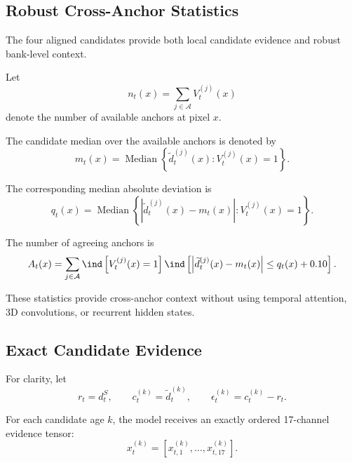\documentclass[11pt,a4paper]{article}
\begin{document}
\subsection{Robust Cross-Anchor Statistics}
\label{sec:cross_anchor_statistics}

The four aligned candidates provide both local candidate evidence and
robust bank-level context.

Let
%
\begin{equation}
n_t(x)
=
\sum_{j\in\mathcal{A}}
V_t^{(j)}(x)
\end{equation}
%
denote the number of available anchors at pixel \(x\).

The candidate median over the available anchors is denoted by
%
\begin{equation}
m_t(x)
=
\operatorname{Median}
\left\{
\widetilde d_t^{(j)}(x):
V_t^{(j)}(x)=1
\right\}.
\label{eq:candidate_median}
\end{equation}

The corresponding median absolute deviation is
%
\begin{equation}
q_t(x)
=
\operatorname{Median}
\left\{
\left|
\widetilde d_t^{(j)}(x)-m_t(x)
\right|:
V_t^{(j)}(x)=1
\right\}.
\label{eq:candidate_mad}
\end{equation}

The number of agreeing anchors is
%
\begin{equation}
A_t(x)
=
\sum_{j\in\mathcal{A}}
\ind
\left[
V_t^{(j)}(x)=1
\right]
\ind
\left[
\left|
\widetilde d_t^{(j)}(x)-m_t(x)
\right|
\leq q_t(x)+0.10
\right].
\label{eq:agreement_count}
\end{equation}

These statistics provide cross-anchor context without using temporal
attention, 3D convolutions, or recurrent hidden states.

\subsection{Exact Candidate Evidence}
\label{sec:candidate_evidence}

For clarity, let
%
\begin{equation}
r_t=d_t^S,
\qquad
c_t^{(k)}=\widetilde d_t^{(k)},
\qquad
\epsilon_t^{(k)}=c_t^{(k)}-r_t.
\end{equation}

For each candidate age \(k\), the model receives an exactly ordered
17-channel evidence tensor:
%
\begin{equation}
x_t^{(k)}
=
\left[
x_{t,1}^{(k)},
\ldots,
x_{t,17}^{(k)}
\right].
\label{eq:evidence_tensor}
\end{equation}
\end{document}
